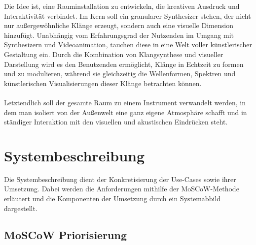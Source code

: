 \documentclass[12pt]{scrartcl}%
\theoremstyle{nonumberplain}
\begin{document}
\noindent Die Idee ist, eine Rauminstallation zu entwickeln, die kreativen Ausdruck und Interaktivität verbindet. Im Kern soll ein granularer Synthesizer stehen, der nicht nur außergewöhnliche Klänge erzeugt, sondern auch eine visuelle Dimension hinzufügt. Unabhängig vom Erfahrungsgrad der Nutzenden im Umgang mit Synthesizern und Videoanimation, tauchen diese in eine Welt voller künstlerischer Gestaltung ein. Durch die Kombination von Klangsynthese und visueller Darstellung wird es den Benutzenden ermöglicht, Klänge in Echtzeit zu formen und zu modulieren, während sie gleichzeitig die Wellenformen, Spektren und künstlerischen Visualisierungen dieser Klänge betrachten können.\\\\
Letztendlich soll der gesamte Raum zu einem Instrument verwandelt werden, in dem man isoliert von der Außenwelt eine ganz eigene Atmosphäre schafft und in ständiger Interaktion mit den visuellen und akustischen Eindrücken steht.


\newpage

\section{Systembeschreibung}

Die Systembeschreibung dient der Konkretisierung der Use-Cases sowie ihrer Umsetzung. Dabei werden die Anforderungen mithilfe der MoSCoW-Methode erläutert und die Komponenten der Umsetzung durch ein Systemabbild dargestellt.

\subsection{MoSCoW Priorisierung}
\end{document}
